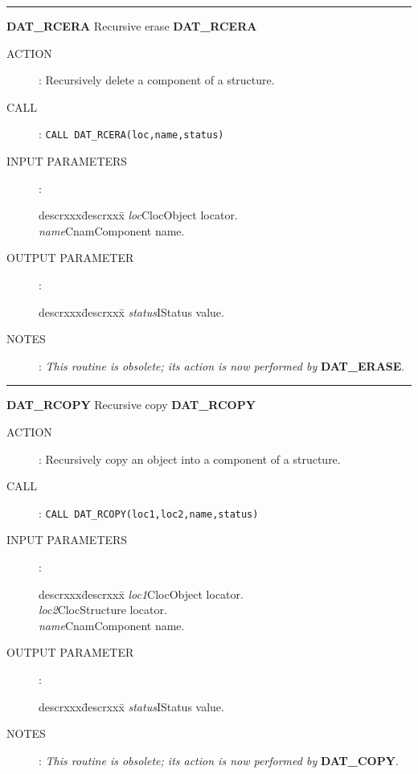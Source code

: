 \rule{\textwidth}{0.3mm}
{\Large {\bf DAT\_RCERA} \hfill Recursive erase \hfill {\bf DAT\_RCERA}}
\begin{description}
\item [ACTION]:
Recursively delete a component of a structure.
\item [CALL]:
{\tt CALL DAT\_RCERA(loc,name,status)}
\item [INPUT PARAMETERS]:
\begin{tabbing}
descrxxx\=descrxxx\=\kill
{\em loc}\>Cloc\>Object locator.\\
{\em name}\>Cnam\>Component name.
\end{tabbing}
\item [OUTPUT PARAMETER]:
\begin{tabbing}
descrxxx\=descrxxx\=\kill
{\em status}\>I\>Status value.
\end{tabbing}
\item [NOTES]:
{\em This routine is obsolete; its action is now performed by} {\bf DAT\_ERASE}.
\end{description}
\goodbreak

\rule{\textwidth}{0.3mm}
{\Large {\bf DAT\_RCOPY} \hfill Recursive copy \hfill {\bf DAT\_RCOPY}}
\begin{description}
\item [ACTION]:
Recursively copy an object into a component of a structure.
\item [CALL]:
{\tt CALL DAT\_RCOPY(loc1,loc2,name,status)}
\item [INPUT PARAMETERS]:
\begin{tabbing}
descrxxx\=descrxxx\=\kill
{\em loc1}\>Cloc\>Object locator.\\
{\em loc2}\>Cloc\>Structure locator.\\
{\em name}\>Cnam\>Component name.
\end{tabbing}
\item [OUTPUT PARAMETER]:
\begin{tabbing}
descrxxx\=descrxxx\=\kill
{\em status}\>I\>Status value.
\end{tabbing}
\item [NOTES]:
{\em This routine is obsolete; its action is now performed by} {\bf DAT\_COPY}.
\end{description}
\goodbreak

